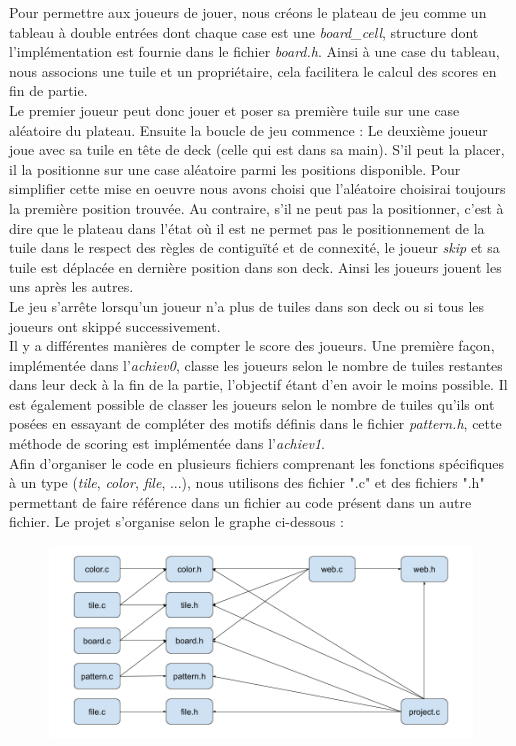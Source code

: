 \documentclass[11pt]{article}
\begin{document}
Pour permettre aux joueurs de jouer, nous créons le plateau de jeu comme un tableau à double entrées dont chaque case est une \emph{board\_cell}, structure dont l'implémentation est fournie dans le fichier \emph{board.h}. Ainsi à une case du tableau, nous associons une tuile et un propriétaire, cela facilitera le calcul des scores en fin de partie. 
\\

Le premier joueur peut donc jouer et poser sa première tuile sur une case aléatoire du plateau. Ensuite la boucle de jeu commence : \newline
Le deuxième joueur joue avec sa tuile en tête de deck (celle qui est dans sa main). S'il peut la placer, il la positionne sur une case aléatoire parmi les positions disponible. Pour simplifier cette mise en oeuvre nous avons choisi que l'aléatoire choisirai toujours la première position trouvée. Au contraire, s'il ne peut pas la positionner, c'est à dire que le plateau dans l'état où il est ne permet pas le positionnement de la tuile dans le respect des règles de contiguïté et de connexité, le joueur \emph{skip} et sa tuile est déplacée en dernière position dans son deck. Ainsi les joueurs jouent les uns après les autres. \\ Le jeu s'arrête lorsqu'un joueur n'a plus de tuiles dans son deck ou si tous les joueurs ont skippé successivement.
\\

Il y a différentes manières de compter le score des joueurs. Une première façon, implémentée dans l'\emph{achiev0}, classe les joueurs selon le nombre de tuiles restantes dans leur deck à la fin de la partie, l'objectif étant d'en avoir le moins possible. Il est également possible de classer les joueurs selon le nombre de tuiles qu'ils ont posées en essayant de compléter des motifs définis dans le fichier \emph{pattern.h}, cette méthode de scoring est implémentée dans l'\emph{achiev1}.
\\

Afin d'organiser le code en plusieurs fichiers comprenant les fonctions spécifiques à un type (\emph{tile}, \emph{color}, \emph{file}, ...), nous utilisons des fichier ".c" et des fichiers ".h" permettant de faire référence dans un fichier au code présent dans un autre fichier. Le projet s'organise selon le graphe ci-dessous :

\begin{figure}[H]
\centering
\includegraphics[scale=0.4]{graph include.png}
\end{figure}
\end{document}
